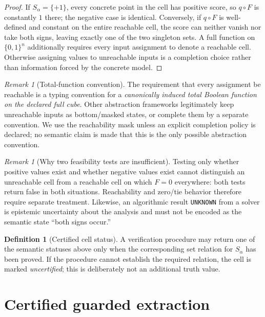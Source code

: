 \documentclass[11pt]{article}
\theoremstyle{definition}
\newtheorem{definition}[theorem]{Definition}
\theoremstyle{remark}
\newtheorem{remark}[theorem]{Remark}
\newcommand{\B}{\{0,1\}}
\begin{document}
\begin{proof}
If $S_\alpha=\{+1\}$, every concrete point in the cell has positive score, so $q\circ F$ is constantly $1$ there; the negative case is identical. Conversely, if $q\circ F$ is well-defined and constant on the entire reachable cell, the score can neither vanish nor take both signs, leaving exactly one of the two singleton sets. A full function on $\B^n$ additionally requires every input assignment to denote a reachable cell. Otherwise assigning values to unreachable inputs is a completion choice rather than information forced by the concrete model.
\end{proof}

\begin{remark}[Total-function convention]
The requirement that every assignment be reachable is a typing convention for a \emph{canonically induced total Boolean function on the declared full cube}. Other abstraction frameworks legitimately keep unreachable inputs as bottom/masked states, or complete them by a separate convention. We use the reachability mask unless an explicit completion policy is declared; no semantic claim is made that this is the only possible abstraction convention.
\end{remark}

\begin{remark}[Why two feasibility tests are insufficient]
Testing only whether positive values exist and whether negative values exist cannot distinguish an unreachable cell from a reachable cell on which $F=0$ everywhere: both tests return false in both situations. Reachability and zero/tie behavior therefore require separate treatment. Likewise, an algorithmic result \texttt{UNKNOWN} from a solver is epistemic uncertainty about the analysis and must not be encoded as the semantic state ``both signs occur.''
\end{remark}

\begin{definition}[Certified cell status]
A verification procedure may return one of the semantic statuses above only when the corresponding set relation for $S_\alpha$ has been proved. If the procedure cannot establish the required relation, the cell is marked \emph{uncertified}; this is deliberately not an additional truth value.
\end{definition}

\section{Certified guarded extraction}\label{sec:certification}
\end{document}
